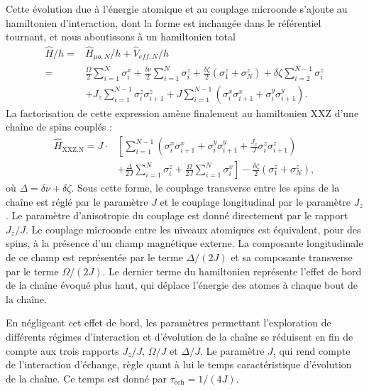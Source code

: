 Cette évolution due à l'énergie atomique et au couplage microonde s'ajoute au hamiltonien d'interaction, dont la forme est inchangée dans le référentiel tournant, et nous aboutissons à un hamiltonien total
%
\begin{equation}
\label{eq:hamilt_tot_N}
\begin{aligned}
\hat{H}/h =& %
\hat{H}_{\mu o,N}/h + \hat{V}_{eff,N}/h \\
=&
\frac{\Omega}{2}\sum_{i=1}^{N}\sigma_i^x +
\frac{\delta\nu}{2}\sum_{i=1}^{N}\sigma_i^z 
+\frac{\delta\zeta}{2} \left( \sigma_1^z + \sigma_N^z \right)
+ \delta\zeta \sum_{i=2}^{N-1} \sigma_i^z \\
&+ J_z \sum_{i=1}^{N-1} \sigma_i^z \sigma_{i+1}^z
+ J \sum_{i=1}^{N-1} \left( \sigma_i^x \sigma_{i+1}^x + \sigma_i^y \sigma_{i+1}^y \right).
\end{aligned}
\end{equation}
%
La factorisation de cette expression amène finalement au hamiltonien \og XXZ \fg{} d'une chaîne de spins couplés :
\begin{equation}
\label{eq:XXZ_Natoms}
\begin{aligned}
\hat{H}_{\text{XXZ,N}} =
J\cdot & \left[
\sum_{i=1}^{N-1} \left( \sigma_i^x\sigma_{i+1}^x 
+ \sigma_i^y \sigma_{i+1}^y
+ \frac{J_z}{J} \sigma_i^z\sigma_{i+1}^z \right) \right. \\
&\left. + \frac{\Delta}{2J}\sum_{i=1}^{N} \sigma_i^z
+ \frac{\Omega}{2J}\sum_{i=1}^{N} \sigma_i^x \right]
- \frac{\delta\zeta}{2}\left( \sigma_1^z + \sigma_N^z \right),
\end{aligned}
\end{equation}
où $\Delta=\delta\nu+\delta\zeta$.
Sous cette forme, le couplage transverse entre les spins de la chaîne est réglé par le paramètre $J$ et le couplage longitudinal par le paramètre $J_z$.
Le paramètre d'anisotropie du couplage est donné directement par le rapport $J_z/J$.
Le couplage microonde entre les niveaux atomiques est équivalent, pour des spins, à la présence d'un champ magnétique externe.
La composante longitudinale de ce \og champ \fg{} est représentée par le terme $\Delta/(2J)$ et sa composante transverse par le terme $\Omega/(2J)$.
Le dernier terme du hamiltonien représente l'effet de bord de la chaîne évoqué plus haut, qui déplace l'énergie des atomes à chaque bout de la chaîne.

En négligeant cet effet de bord, les paramètres permettant l'exploration de différents régimes d'interaction et d'évolution de la chaîne se réduisent en fin de compte aux trois rapports $J_z/J$, $\Omega/J$ et $\Delta/J$.
Le paramètre $J$, qui rend compte de l'interaction d'échange, règle quant à lui le temps caractéristique d'évolution de la chaîne.
Ce temps est donné par $\tau_{\text{\'ech}} = 1/(4J)$.

